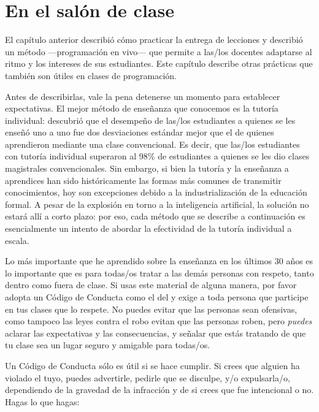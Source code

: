\chapter{En el salón de clase}\label{s:classroom}

El capítulo anterior describió cómo practicar la entrega de lecciones
y describió un método ---programación en vivo--- que
permite a las/los docentes adaptarse al ritmo y los intereses de sus estudiantes.
Este capítulo describe otras prácticas que también son útiles en clases de programación.

Antes de describirlas,
vale la pena detenerse un momento para establecer expectativas.
El mejor método de enseñanza que conocemos es la tutoría individual: 
\cite{Bloo1984} descubrió que el desempeño de las/los estudiantes a quienes se les enseñó uno a uno
fue dos desviaciones estándar mejor que el de quienes aprendieron mediante una clase convencional.
Es decir, que las/los estudiantes con tutoría individual superaron al
98\% de estudiantes a quienes se les dio clases magistrales convencionales.
Sin embargo,
si bien la tutoría y la enseñanza a aprendices han sido históricamente las formas más comunes de transmitir conocimientos,
hoy son excepciones debido a la
industrialización de la educación formal.
A pesar de la explosión en torno a la inteligencia artificial,
la solución no estará allí a corto plazo:
por eso, cada método que se describe a continuación es esencialmente
un intento de abordar la efectividad de la tutoría individual a escala.


Lo más importante que he aprendido sobre la enseñanza en los últimos 30 años es
lo importante que es para todas/os tratar a las demás personas con respeto,
tanto dentro como fuera de clase.
Si usas este material de alguna manera,
por favor adopta un Código de Conducta como el del 
y exige a toda persona que participe en tus clases que lo respete.
No puedes evitar que las personas sean ofensivas,
como tampoco las leyes contra el robo evitan que las personas roben,
pero \emph{puedes} aclarar las expectativas y las consecuencias,
y señalar que estás tratando de que tu clase sea un lugar seguro y amigable para todas/os.

Un Código de Conducta sólo es útil si se hace cumplir.
Si crees que alguien ha violado el tuyo,
puedes advertirle,
pedirle que se disculpe,
y/o expulsarla/o,
dependiendo de la gravedad de la infracción y de si crees que fue intencional o no.
Hagas lo que hagas:

